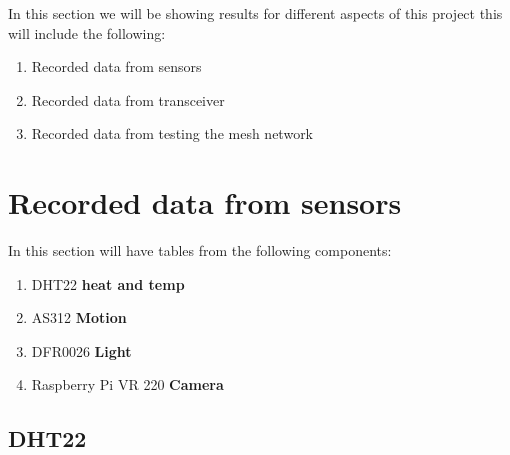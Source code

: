 In this section we will  be showing results for  different aspects of this project this  will  include the following:
\begin{enumerate}
    \item Recorded data from sensors
    \item Recorded data from transceiver
    \item Recorded data from  testing the mesh network
\end{enumerate}
\section{Recorded data from sensors}
In this section  will have  tables from the following components:
\begin{enumerate}
    \item DHT22 \textbf{heat and temp}
    \item AS312 \textbf{Motion }
    \item DFR0026 \textbf{Light}
    \item Raspberry Pi VR 220 \textbf{Camera}
\end{enumerate}
\subsection{DHT22}
